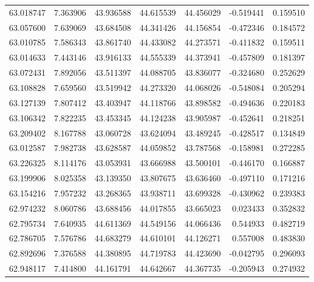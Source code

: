 \begin{tabular}{rrrrrrr}
 63.018747 &   7.363906 &         43.936588 &         44.615539 &         44.456029 & -0.519441 &  0.159510 \\
 63.057600 &   7.639069 &         43.684508 &         44.341426 &         44.156854 & -0.472346 &  0.184572 \\
 63.010785 &   7.586343 &         43.861740 &         44.433082 &         44.273571 & -0.411832 &  0.159511 \\
 63.014633 &   7.443146 &         43.916133 &         44.555339 &         44.373941 & -0.457809 &  0.181397 \\
 63.072431 &   7.892056 &         43.511397 &         44.088705 &         43.836077 & -0.324680 &  0.252629 \\
 63.108828 &   7.659560 &         43.519942 &         44.273320 &         44.068026 & -0.548084 &  0.205294 \\
 63.127139 &   7.807412 &         43.403947 &         44.118766 &         43.898582 & -0.494636 &  0.220183 \\
 63.106342 &   7.822235 &         43.453345 &         44.124238 &         43.905987 & -0.452641 &  0.218251 \\
 63.209402 &   8.167788 &         43.060728 &         43.624094 &         43.489245 & -0.428517 &  0.134849 \\
 63.012587 &   7.982738 &         43.628587 &         44.059852 &         43.787568 & -0.158981 &  0.272285 \\
 63.226325 &   8.114176 &         43.053931 &         43.666988 &         43.500101 & -0.446170 &  0.166887 \\
 63.199906 &   8.025358 &         43.139350 &         43.807675 &         43.636460 & -0.497110 &  0.171216 \\
 63.154216 &   7.957232 &         43.268365 &         43.938711 &         43.699328 & -0.430962 &  0.239383 \\
 62.974232 &   8.060786 &         43.688456 &         44.017855 &         43.665023 &  0.023433 &  0.352832 \\
 62.795734 &   7.640935 &         44.611369 &         44.549156 &         44.066436 &  0.544933 &  0.482719 \\
 62.786705 &   7.576786 &         44.683279 &         44.610101 &         44.126271 &  0.557008 &  0.483830 \\
 62.892696 &   7.376588 &         44.380895 &         44.719783 &         44.423690 & -0.042795 &  0.296093 \\
 62.948117 &   7.414800 &         44.161791 &         44.642667 &         44.367735 & -0.205943 &  0.274932 \\

\end{tabular}
